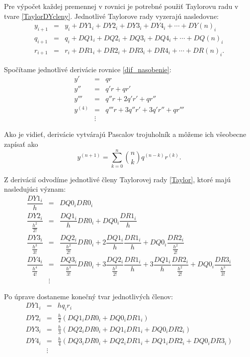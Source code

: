 Pre výpočet každej premennej v rovnici je potrebné použiť Taylorovu radu v tvare \eqref{TaylorDYcleny}. Jednotlivé Taylorove rady vyzerajú nasledovne:
\begin{eqnarray}
y_{i + 1} & = & y_{i} + DY1_{i} + DY2_{i} + DY3_{i} + DY4_{i} + \cdots + DY(n)_{i}\\
q_{i+1} & = & q_i + DQ1_i + DQ2_i + DQ3_i + DQ4_i + \cdots + DQ(n)_i\\
r_{i+1} & = & r_i + DR1_i + DR2_i + DR3_i + DR4_i + \cdots + DR(n)_i .
\end{eqnarray}


Spočítame jednotlivé derivácie rovnice \eqref{dif_nasobenie}:
\begin{eqnarray}
y' & = & qr \nonumber \\
y'' & = & q'r + qr' \nonumber \\
y''' & = & q''r + 2q'r' + qr'' \nonumber \\
y^{(4)} & = & q'''r + 3q''r'+ 3q'r'' + qr''' \nonumber \\
 & \vdots \nonumber &
\end{eqnarray}


Ako je vidieť, derivácie vytvárajú Pascalov trojuholník a môžeme ich všeobecne zapísať ako
\begin{equation}
y^{(n+1)} = \sum_{k=0}^n \binom{n}{k} q^{(n-k)} r^{(k)} . \nonumber
\end{equation}
\bigskip

Z derivácií odvodíme jednotlivé členy Taylorovej rady \eqref{Taylor}, ktoré majú nasledujúci význam:
\begin{eqnarray}
\dfrac{DY1_{i}}{h} & = & DQ0_i DR0_i \\
\dfrac{DY2_{i}}{\frac{h^{2}}{2!}} & = & \dfrac{DQ1_i}{h} DR0_i + DQ0_i \dfrac{DR1_i}{h} \nonumber \\
\dfrac{DY3_{i}}{\frac{h^{3}}{3!}} & = & \dfrac{DQ2_i}{\frac{h^{2}}{2!}} DR0_i + 2 \dfrac{DQ1_i}{h} \dfrac{DR1_i}{h} + DQ0_i \dfrac{DR2_i}{\frac{h^{2}}{2!}} \nonumber \\
\dfrac{DY4_{i}}{\frac{h^{4}}{4!}} & = & \dfrac{DQ3_i}{\frac{h^{3}}{3!}} DR0_i + 3 \dfrac{DQ2_i}{\frac{h^{2}}{2!}} \dfrac{DR1_i}{h} + 3 \dfrac{DQ1_i}{h} \dfrac{DR2_i}{\frac{h^{2}}{2!}} + DQ0_i \dfrac{DR3_i}{\frac{h^{3}}{3!}} \nonumber \\
& \vdots \nonumber & 
\end{eqnarray}



Po úprave dostaneme konečný tvar jednotlivých členov:
\begin{eqnarray}
DY1_{i} & = & hq_{i}r_{i} \label{DY1_cleny_nasobenia} \\
DY2_{i} & = & \frac{h}{2} (DQ1_{i}DR0_{i} + DQ0_{i}DR1_{i}) \label{DY2_cleny_nasobenia} \\
DY3_{i} & = & \frac{h}{3} (DQ2_{i}DR0_{i} + DQ1_{i}DR1_{i} + DQ0_{i}DR2_{i}) \label{DY3_cleny_nasobenia} \\
DY4_{i} & = & \frac{h}{4} (DQ3_{i}DR0_{i} + DQ2_{i}DR1_{i} + DQ1_{i}DR2_{i} + DQ0_{i}DR3_{i}) \label{DY4_cleny_nasobenia} \\
& \vdots \nonumber &
\end{eqnarray}

